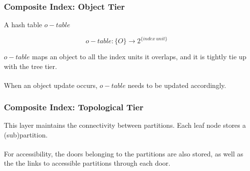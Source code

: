 
\begin{frame}
\frametitle{Composite Index: Object Tier}

A hash table $o-table$

\begin{equation*}
  o-table : \{ O \} \rightarrow 2^{\{index~unit\}}
\end{equation*}

$o-table$ maps an object to all the index units it overlaps, and it is tightly tie up with the tree tier.\\~\\

When an object update occurs, $o-table$ needs to be updated accordingly.

\end{frame}


\begin{frame}
\frametitle{Composite Index: Topological Tier}

This layer maintains the connectivity between partitions. Each leaf node stores a (sub)partition.\\~\\

For accessibility, the doors belonging to the partitions are also stored, as well as the the links to accessible partitions through each door.

\end{frame}


